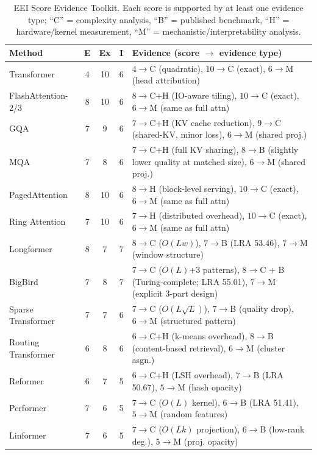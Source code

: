 \documentclass[10pt,twocolumn]{article}
\newif\ifshrinkfloats
\newcommand{\sflt}[2]{\ifshrinkfloats#1\else#2\fi}
\begin{document}
\begin{table}[!tbp]
\centering
\sflt{\fontsize{8.75}{10.4}\selectfont}{\footnotesize}
\renewcommand{\arraystretch}{\sflt{1.2}{1.4}}
\caption{EEI Score Evidence Toolkit. Each score is supported by at least one evidence type; ``C'' = complexity analysis, ``B'' = published benchmark, ``H'' = hardware/kernel measurement, ``M'' = mechanistic/interpretability analysis.}
\label{tab:eei-evidence}
\begin{tabular}{p{2.2cm}c c c p{5.5cm}}
\toprule
Method & E & Ex & I & Evidence (score $\to$ evidence type) \\
\midrule
Transformer & 4 & 10 & 6 & $4\!\to\!$C (quadratic), $10\!\to\!$C (exact), $6\!\to\!$M (head attribution) \\
FlashAttention-2/3 & 8 & 10 & 6 & $8\!\to\!$C+H (IO-aware tiling), $10\!\to\!$C (exact), $6\!\to\!$M (same as full attn) \\
GQA & 7 & 9 & 6 & $7\!\to\!$C+H (KV cache reduction), $9\!\to\!$C (shared-KV, minor loss), $6\!\to\!$M (shared proj.) \\
MQA & 7 & 8 & 6 & $7\!\to\!$C+H (full KV sharing), $8\!\to\!$B (slightly lower quality at matched size), $6\!\to\!$M (shared proj.) \\
PagedAttention & 8 & 10 & 6 & $8\!\to\!$H (block-level serving), $10\!\to\!$C (exact), $6\!\to\!$M (same as full attn) \\
Ring Attention & 7 & 10 & 6 & $7\!\to\!$H (distributed overhead), $10\!\to\!$C (exact), $6\!\to\!$M (same as full attn) \\
Longformer & 8 & 7 & 7 & $8\!\to\!$C ($O(Lw)$), $7\!\to\!$B (LRA 53.46), $7\!\to\!$M (window structure) \\
BigBird & 7 & 8 & 7 & $7\!\to\!$C ($O(L)$+3 patterns), $8\!\to\!$C + B (Turing-complete; LRA 55.01), $7\!\to\!$M (explicit 3-part design) \\
Sparse Transformer & 7 & 7 & 6 & $7\!\to\!$C ($O(L\sqrt{L})$), $7\!\to\!$B (quality drop), $6\!\to\!$M (structured pattern) \\
Routing Transformer & 6 & 8 & 6 & $6\!\to\!$C+H (k-means overhead), $8\!\to\!$B (content-based retrieval), $6\!\to\!$M (cluster asgn.) \\
Reformer & 6 & 7 & 5 & $6\!\to\!$C+H (LSH overhead), $7\!\to\!$B (LRA 50.67), $5\!\to\!$M (hash opacity) \\
Performer & 7 & 6 & 5 & $7\!\to\!$C ($O(L)$ kernel), $6\!\to\!$B (LRA 51.41), $5\!\to\!$M (random features) \\
Linformer & 7 & 6 & 5 & $7\!\to\!$C ($O(Lk)$ projection), $6\!\to\!$B (low-rank deg.), $5\!\to\!$M (proj. opacity) \\

\end{tabular}
\end{table}
\end{document}
